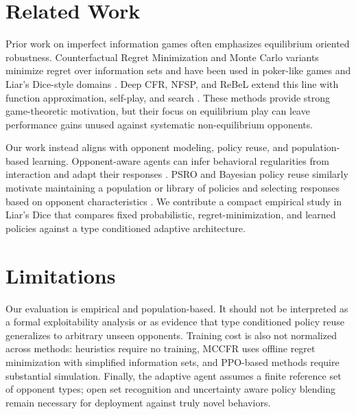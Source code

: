 \documentclass{article}
\begin{document}
\section{Related Work}
Prior work on imperfect information games often emphasizes equilibrium oriented robustness. Counterfactual Regret Minimization and Monte Carlo variants minimize regret over information sets and have been used in poker-like games and Liar's Dice-style domains \cite{cfr,mccfr}. Deep CFR, NFSP, and ReBeL extend this line with function approximation, self-play, and search \cite{brown2019deep,heinrich2016deep,kawamura2017neural,brown2020combining}. These methods provide strong game-theoretic motivation, but their focus on equilibrium play can leave performance gains unused against systematic non-equilibrium opponents.

Our work instead aligns with opponent modeling, policy reuse, and population-based learning. Opponent-aware agents can infer behavioral regularities from interaction and adapt their responses \cite{he2016opponent,yu2022model,jing2024opponent,yu2024opponent}. PSRO and Bayesian policy reuse similarly motivate maintaining a population or library of policies and selecting responses based on opponent characteristics \cite{lanctot2017unified,rosman2016bayesian}. We contribute a compact empirical study in Liar's Dice that compares fixed probabilistic, regret-minimization, and learned policies against a type conditioned adaptive architecture.


\section{Limitations}
Our evaluation is empirical and population-based. It should not be interpreted as a formal exploitability analysis or as evidence that type conditioned policy reuse generalizes to arbitrary unseen opponents. Training cost is also not normalized across methods: heuristics require no training, MCCFR uses offline regret minimization with simplified information sets, and PPO-based methods require substantial simulation. Finally, the adaptive agent assumes a finite reference set of opponent types; open set recognition and uncertainty aware policy blending remain necessary for deployment against truly novel behaviors.
\end{document}
